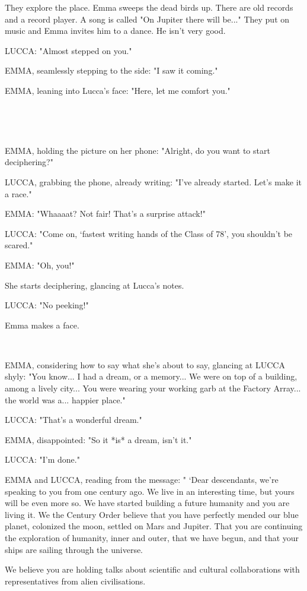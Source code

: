 \documentclass[11pt]{article}
\begin{document}
They explore the place.
Emma sweeps the dead birds up.
There are old records and a record player.
A song is called "On Jupiter there will be..."
They put on music and Emma invites him to a dance.
He isn't very good. 

LUCCA: "Almost stepped on you."

EMMA, seamlessly stepping to the side: "I saw it coming."

EMMA, leaning into Lucca's face: "Here, let me comfort you."

\ 

\ 

EMMA, holding the picture on her phone: "Alright, do you want to start deciphering?"

LUCCA, grabbing the phone, already writing: "I've already started. Let's make it a race."

EMMA: "Whaaaat? Not fair! That's a surprise attack!"

LUCCA: "Come on, `fastest writing hands of the Class of 78', you shouldn't be scared."

EMMA: "Oh, you!"

She starts deciphering, glancing at Lucca's notes.

LUCCA: "No peeking!" 

Emma makes a face.

\ 

EMMA, considering how to say what she's about to say, glancing at LUCCA shyly: "You know...
I had a dream, or a memory...
We were on top of a building, among a lively city...
You were wearing your working garb at the Factory Array...
the world was a... happier place."

LUCCA: "That's a wonderful dream."

EMMA, disappointed: "So it *is* a dream, isn't it."

LUCCA: "I'm done."

EMMA and LUCCA, reading from the message: "
`Dear descendants, we're speaking to you from one century ago.
We live in an interesting time, but yours will be even more so.
We have started building a future humanity and you are living it.
We the Century Order believe that you have perfectly mended our blue planet, colonized the moon, settled on Mars and Jupiter.
That you are continuing the exploration of humanity, inner and outer, that we have begun, and that your ships are sailing through the universe. 

We believe you are holding talks about scientific and cultural collaborations with representatives from alien civilisations.
\end{document}
